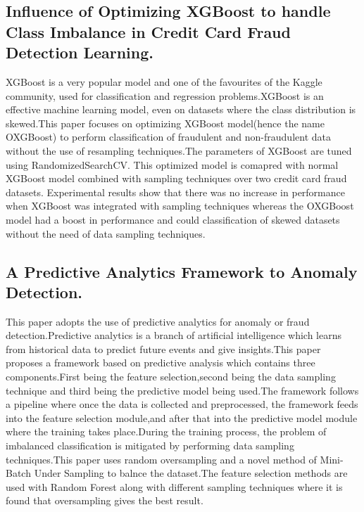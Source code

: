 \documentclass[a4paper, 12pt]{article}
\begin{document}
\subsection{Influence of Optimizing XGBoost to handle Class Imbalance in Credit Card Fraud Detection Learning.}
\hspace{1cm}  
XGBoost is a very popular model and one of the favourites of the Kaggle community, used for classification and regression problems.XGBoost is an effective machine learning model, even on datasets where the class distribution is skewed.This paper focuses on optimizing XGBoost model(hence the name OXGBoost) to perform classification of fraudulent and non-fraudulent data without the use of resampling techniques.The parameters of XGBoost are tuned using RandomizedSearchCV. This optimized model is comapred with normal XGBoost model combined with sampling techniques over two credit card fraud datasets. Experimental results show that there was no increase in performance when XGBoost was integrated with sampling techniques whereas the OXGBoost model had a boost in performance and could classification of skewed datasets without the need of data sampling techniques.


\subsection{A Predictive Analytics Framework to Anomaly Detection.}
\hspace{1cm} 
This paper adopts the use of predictive analytics for anomaly or fraud detection.Predictive analytics is a branch of artificial intelligence which learns from historical data to predict future events and give insights.This paper proposes a framework based on predictive analysis which contains three components.First being the feature selection,second being the data sampling technique and third being the predictive model being used.The framework follows a pipeline where once the data is collected and preprocessed, the framework feeds into the feature selection module,and after that into the predictive model module where the training takes place.During the training process, the problem of imbalanced classification is mitigated by performing data sampling techniques.This paper uses random oversampling and a novel method of Mini-Batch Under Sampling to balnce the dataset.The feature selection methods are used with Random Forest along with different sampling techniques where it is found that oversampling gives the best result. 
\end{document}
